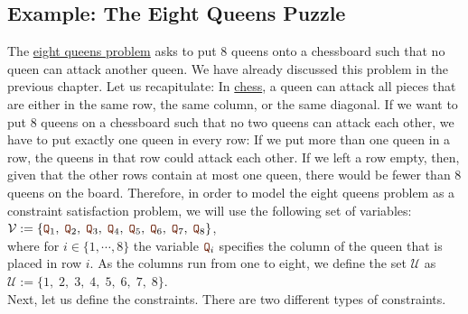 \subsection{Example: The Eight Queens Puzzle}
The \href{https://en.wikipedia.org/wiki/Eight_queens_puzzle}{eight queens problem} asks to put 8 queens onto a
chessboard such that no queen can attack another queen.  We have already discussed this problem in the previous
chapter.  Let us recapitulate: In \href{https://en.wikipedia.org/wiki/Chess}{chess},
a queen can attack all pieces that are either in the same row, the same column, or the same diagonal.  If we
want to put 8 queens on a chessboard such that no two queens can attack each other, we have to put exactly one
queen in every row:  If we put more than one queen in a row, the queens in that row could attack each other.
If we left a row empty, then, given that the other rows contain at most one queen, there would be fewer
than 8 queens on the board.  Therefore, in order to model the eight queens problem as a constraint satisfaction
problem, we will use the following set of variables:
\\[0.2cm]
\hspace*{1.3cm}
$\mathcal{V} := \{ \mytt{Q}_1,\; \mytt{Q}_2,\; \mytt{Q}_3,\; \mytt{Q}_4,\; \mytt{Q}_5,\; \mytt{Q}_6,\; \mytt{Q}_7,\;\mytt{Q}_8 \}$,
\\[0.2cm]
where for $i \in \{1,\cdots,8\}$ the variable $\mytt{Q}_i$ specifies the column of the queen that is placed in
row $i$.   As the columns run from one to eight, we define the set $\mathcal{U}$ as
\\[0.2cm]
\hspace*{1.3cm}
$\mathcal{U} := \{1,\;2,\;3,\;4,\;5,\;6,\;7,\;8\}$.
\\[0.2cm]
Next, let us define the constraints.  There are two different types of constraints.
